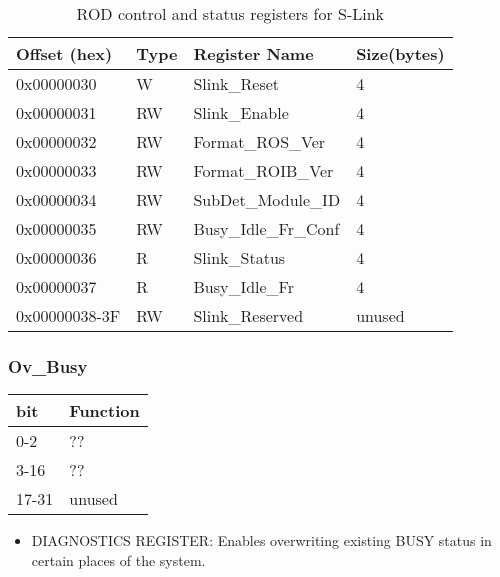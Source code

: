 \begin {table}[H]
\begin{center}
\caption {ROD control and status registers for S-Link}
\label{rod_control_slink}
\begin{tabular}{|l|l|l|l|}
\hline
Offset (hex)& Type & Register Name & Size(bytes)\\
\hline
0x00000030 & W & Slink\_Reset & 4 \\
\hline
0x00000031 & RW & Slink\_Enable & 4 \\
\hline
0x00000032 & RW & Format\_ROS\_Ver & 4 \\
\hline
0x00000033 & RW & Format\_ROIB\_Ver & 4 \\
\hline
0x00000034 & RW & SubDet\_Module\_ID & 4 \\
\hline
0x00000035 & RW & Busy\_Idle\_Fr\_Conf & 4 \\
\hline
0x00000036 & R & Slink\_Status & 4 \\
\hline
0x00000037 & R & Busy\_Idle\_Fr & 4 \\
\hline
0x00000038-3F & RW & Slink\_Reserved & unused \\
\hline
\end{tabular}
\end{center}
\end{table}



\subsubsection{Ov\_Busy}

\begin {table}[H]
\begin{center}
\begin{tabular}{|l|l|}
\hline
\textbf{bit} & \textbf{Function} \\
\hline
0-2 & ?? \\
\hline
3-16 & ??  \\
\hline
17-31 & unused \\
\end{tabular}
\end{center}
\end{table}


\begin{itemize}
\item DIAGNOSTICS REGISTER: Enables overwriting existing BUSY status in certain places of the system.
\end{itemize}



